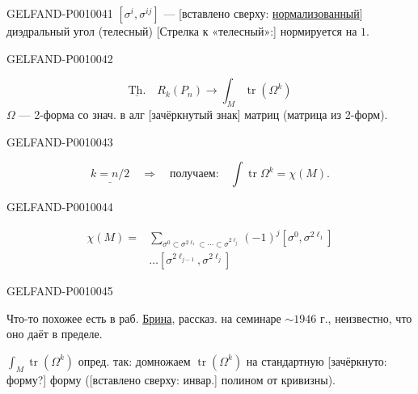 \begin{GelfandAdjacentEvidence}{GELFAND-P001004}{1}
$[\sigma^i,\sigma^{ij}]$ --- [вставлено сверху: \underline{нормализованный}] диэдральный угол (телесный)
[Стрелка к «телесный»:] нормируется на $1$.
\end{GelfandAdjacentEvidence}
\begin{GelfandAdjacentEvidence}{GELFAND-P001004}{2}


\begin{equation*}
\underline{\text{Th.}}\quad R_k(P_n)\longrightarrow\int_M\operatorname{tr}(\Omega^k) \tag{19}
\end{equation*}
$\Omega$ --- 2-форма со знач. в алг [зачёркнутый знак] матриц (матрица из 2-форм).
\end{GelfandAdjacentEvidence}
\begin{GelfandAdjacentEvidence}{GELFAND-P001004}{3}

\begin{equation*}
\underline{k=n/2}\quad\Rightarrow\quad\text{получаем:}\quad\int\operatorname{tr}\Omega^k=\chi(M).
\end{equation*}
\end{GelfandAdjacentEvidence}
\begin{GelfandAdjacentEvidence}{GELFAND-P001004}{4}

\begin{equation*}
\begin{aligned}
\chi(M)={}&\sum_{\sigma^0\subset\sigma^{2\ell_1}\subset\cdots\subset\sigma^{2\ell_j}}
(-1)^j[\sigma^0,\sigma^{2\ell_1}]\\
&\ldots[\sigma^{2\ell_{j-1}},\sigma^{2\ell_j}]
\end{aligned}\tag{20}
\end{equation*}
\end{GelfandAdjacentEvidence}
\begin{GelfandAdjacentEvidence}{GELFAND-P001004}{5}

Что-то похожее есть в раб. \underline{Брина}, рассказ. на семинаре $\sim1946$ г., неизвестно, что оно даёт в пределе.

$\displaystyle\int_M\operatorname{tr}(\Omega^k)$ опред. так: домножаем $\operatorname{tr}(\Omega^k)$ на стандартную [зачёркнуто: форму?] форму ([вставлено сверху: инвар.] полином от кривизны).
\end{GelfandAdjacentEvidence}
